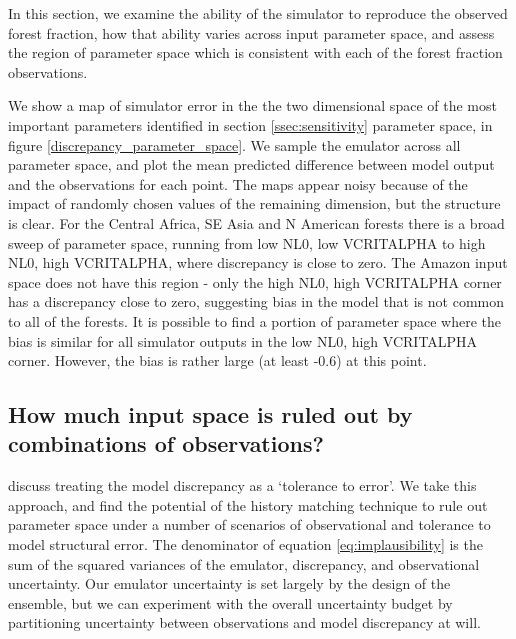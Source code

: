\documentclass[esd, manuscript]{copernicus}
\begin{document}
In this section, we examine the ability of the simulator to reproduce the observed forest fraction, how that ability varies across input parameter space, and assess the region of parameter space which is consistent with each of the forest fraction observations.

We show a map of simulator error in the the two dimensional space of the most important parameters identified in section \ref{ssec:sensitivity} parameter space, in figure \ref{discrepancy_parameter_space}. We sample the emulator across all parameter space, and plot the mean predicted difference between model output and the observations for each point. The maps appear noisy because of the impact of randomly chosen values of the remaining dimension, but the structure is clear. For the Central Africa, SE Asia and N American forests there is a broad sweep of parameter space, running from low NL0, low VCRITALPHA to high NL0, high VCRITALPHA, where discrepancy is close to zero. The Amazon input space does not have this region - only the high NL0, high VCRITALPHA corner has a discrepancy close to zero, suggesting bias in the model that is not common to all of the forests. It is possible to find a portion of parameter space where the bias is similar for all simulator outputs in the low NL0, high VCRITALPHA corner. However, the bias is rather large (at least -0.6) at this point.


\subsection{How much input space is ruled out by combinations of observations?}\label{combinations}

\citep{williamson2014identifying} discuss treating the model discrepancy as a `tolerance to error'. We take this approach, and find the potential of the history matching technique to rule out parameter space under a number of scenarios of observational and tolerance to model structural error. The denominator of equation \ref{eq:implausibility} is the sum of the squared variances of the emulator, discrepancy, and observational uncertainty. Our emulator uncertainty is set largely by the design of the ensemble, but we can experiment with the overall uncertainty budget by partitioning uncertainty between observations and model discrepancy at will.
\end{document}
